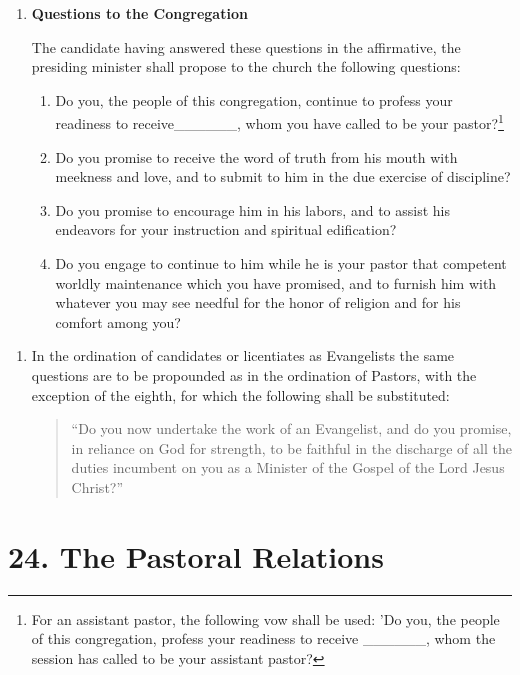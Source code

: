 \documentclass[
]{book}
\providecommand{\tightlist}{%
  \setlength{\itemsep}{0pt}\setlength{\parskip}{0pt}}
\begin{document}
\begin{enumerate}
\def\labelenumi{\arabic{enumi}.}
\setcounter{enumi}{10}
\item
  \textbf{Questions to the Congregation}

  The candidate having answered these questions in the affirmative, the presiding minister shall propose to the church the following questions:

  \begin{enumerate}
  \def\labelenumii{\alph{enumii}.}
  \tightlist
  \item
    Do you, the people of this congregation, continue to profess your readiness to receive\_\_\_\_\_\_, whom you have called to be your pastor?\footnote{For an assistant pastor, the following vow shall be used: 'Do you, the people of this congregation, profess your readiness to receive \_\_\_\_\_\_, whom the session has called to be your assistant pastor?}
  \item
    Do you promise to receive the word of truth from his mouth with meekness and love, and to submit to him in the due exercise of discipline?
  \item
    Do you promise to encourage him in his labors, and to assist his endeavors for your instruction and spiritual edification?
  \item
    Do you engage to continue to him while he is your pastor that competent worldly maintenance which you have promised, and to furnish him with whatever you may see needful for the honor of religion and for his comfort among you?
  \end{enumerate}
\end{enumerate}

\begin{enumerate}
\def\labelenumi{\arabic{enumi}.}
\setcounter{enumi}{11}
\item
  In the ordination of candidates or licentiates as Evangelists the same questions are to be propounded as in the ordination of Pastors, with the exception of the eighth, for which the following shall be substituted:

  \begin{quote}
  ``Do you now undertake the work of an Evangelist, and do you promise, in reliance on God for strength, to be faithful in the discharge of all the duties incumbent on you as a Minister of the Gospel of the Lord Jesus Christ?''
  \end{quote}
\end{enumerate}

\hypertarget{the-pastoral-relations}{%
\section*{24. The Pastoral Relations}\label{the-pastoral-relations}}
\end{document}
